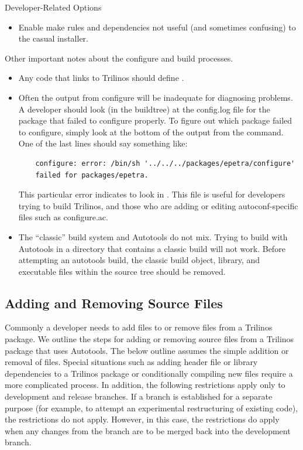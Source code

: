 \documentclass[12pt,relax]{TrilinosDevGuide}
\begin{document}
Developer-Related Options
\begin{itemize}
\item {}

Enable make rules and dependencies not useful (and sometimes confusing) to 
the casual installer.
\end{itemize}

Other important notes about the configure and build processes.
\begin{itemize}
\item Any code that links to Trilinos should define 
.

\item Often the output from configure will be inadequate for diagnosing 
problems.  A developer should look (in the buildtree) at the config.log file 
for the package that failed to configure properly.  To figure out which 
package failed to configure, simply look at the bottom of the output from the 
 command.  One of the last lines should say something 
like:

\begin{verbatim}
    configure: error: /bin/sh '../../../packages/epetra/configure' 
    failed for packages/epetra.
\end{verbatim}

This particular error indicates to look in 
.  This file is useful for 
developers trying to build Trilinos, and those who are 
adding or editing autoconf-specific files such as configure.ac.

\item The ``classic'' build system and Autotools do not mix.  Trying to build 
with Autotools in a directory that contains a classic build will not work.  
Before attempting an autotools build, the classic build object, library, and 
executable files within the source tree should be removed.
\end{itemize}

\subsection{Adding and Removing Source Files}
\label{Subsection:AddSource}
Commonly a developer needs to add files to or remove files from a Trilinos 
package.  We outline the steps for adding or removing source files from a 
Trilinos package that uses Autotools.  The below outline assumes the simple 
addition or removal of files.  Special situations such as adding header file 
or library dependencies to a Trilinos package or conditionally compiling new 
files require a more complicated process.  In addition, the following 
restrictions apply only to development and release branches.  If a branch is 
established for a separate purpose (for example, to attempt an experimental 
restructuring of existing code), the restrictions do not apply.  However, in 
this case, the restrictions do apply when any changes from the branch are to 
be merged back into the development branch.
 
\end{document}
